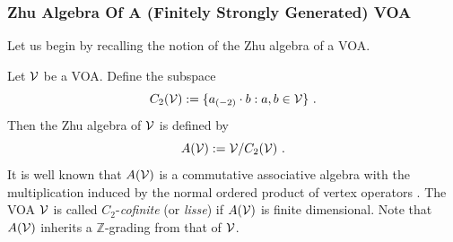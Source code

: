 \documentclass[a4paper,10pt]{article}
\newcommand{\Z}{\mathds{Z}}
\newcommand{\tsf}[1]{\textsf{#1}}
\def\CV {{\cal V}}
\begin{document}
\subsubsection{Zhu Algebra Of A (Finitely Strongly Generated) \tsf{VOA}}
Let us begin by recalling the notion of the Zhu algebra of a \tsf{VOA}. 

Let $\CV$ be a \tsf{VOA}. Define the subspace 
\begin{equation}
    C_2(\CV):=\{a_{(-2)}\cdot b:a,b\in\CV\}~.
\end{equation}
Then the Zhu algebra of $\CV$ is defined by 
\begin{equation}
    A(\CV):=\CV/C_2(\CV)~.
\end{equation}
It is well known that $A(\CV)$ is a commutative associative algebra with the multiplication induced by the normal ordered product of vertex operators \cite{Zhu1995ModularIO}. The \tsf{VOA} $\CV$ is called $C_2$-\textit{cofinite} (or \textit{lisse}) if $A(\CV)$ is finite dimensional. Note that $A(\CV)$ inherits a $\Z$-grading from that of $\CV$. 
\end{document}
